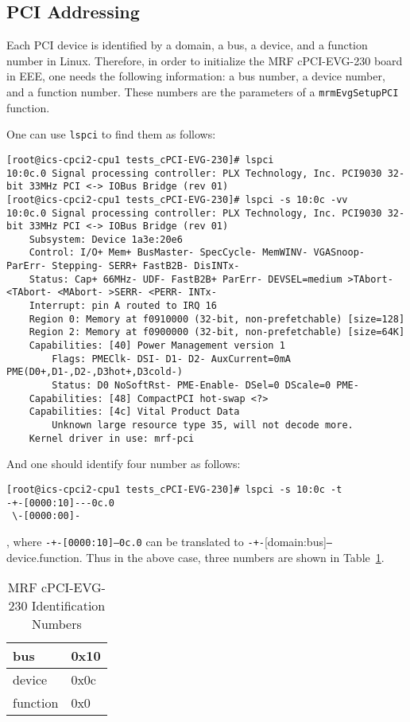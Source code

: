 \documentclass[11pt
  , a4paper
  , article
  , oneside
  , showtrims
]{memoir}
\begin{document}
\subsection{PCI Addressing}
Each PCI device is identified by a domain, a bus, a device, and a function number in Linux. Therefore, in order to initialize the MRF cPCI-EVG-230 board in EEE, one needs the following information: a bus number, a device number, and a function number. These numbers are the parameters of a \texttt{mrmEvgSetupPCI} function.

One can use \texttt{lspci} to find them as follows:
\begin{lstlisting}[style=termstyle]
[root@ics-cpci2-cpu1 tests_cPCI-EVG-230]# lspci
10:0c.0 Signal processing controller: PLX Technology, Inc. PCI9030 32-bit 33MHz PCI <-> IOBus Bridge (rev 01)
[root@ics-cpci2-cpu1 tests_cPCI-EVG-230]# lspci -s 10:0c -vv
10:0c.0 Signal processing controller: PLX Technology, Inc. PCI9030 32-bit 33MHz PCI <-> IOBus Bridge (rev 01)
	Subsystem: Device 1a3e:20e6
	Control: I/O+ Mem+ BusMaster- SpecCycle- MemWINV- VGASnoop- ParErr- Stepping- SERR+ FastB2B- DisINTx-
	Status: Cap+ 66MHz- UDF- FastB2B+ ParErr- DEVSEL=medium >TAbort- <TAbort- <MAbort- >SERR- <PERR- INTx-
	Interrupt: pin A routed to IRQ 16
	Region 0: Memory at f0910000 (32-bit, non-prefetchable) [size=128]
	Region 2: Memory at f0900000 (32-bit, non-prefetchable) [size=64K]
	Capabilities: [40] Power Management version 1
		Flags: PMEClk- DSI- D1- D2- AuxCurrent=0mA PME(D0+,D1-,D2-,D3hot+,D3cold-)
		Status: D0 NoSoftRst- PME-Enable- DSel=0 DScale=0 PME-
	Capabilities: [48] CompactPCI hot-swap <?>
	Capabilities: [4c] Vital Product Data
		Unknown large resource type 35, will not decode more.
	Kernel driver in use: mrf-pci

\end{lstlisting}

And one should identify four number as follows:
\begin{lstlisting}[style=termstyle]
[root@ics-cpci2-cpu1 tests_cPCI-EVG-230]# lspci -s 10:0c -t
-+-[0000:10]---0c.0
 \-[0000:00]-
\end{lstlisting}
, where \texttt{-+-[0000:10]---0c.0} can be translated to \texttt{-+-}[domain:bus]\texttt{---}device.function. Thus in the above case, three numbers are shown in Table~\ref{table:pciidnumber}.\begin{table}[!htb]
  \centering
  \begin{tabular}{l|l}
    \toprule
    bus      & 0x10 \\\midrule
    device   & 0x0c \\\midrule
    function & 0x0 \\\bottomrule
  \end{tabular}
  \caption[]{MRF cPCI-EVG-230 Identification Numbers}
  \label{table:pciidnumber}
\end{table}
\end{document}
